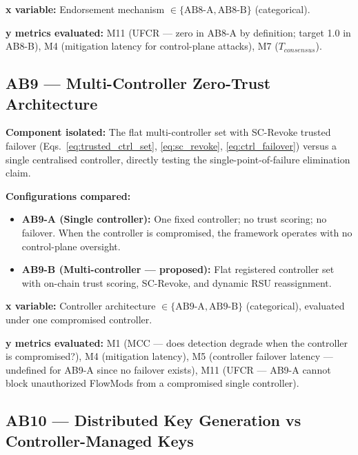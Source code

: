\documentclass[12pt, a4paper]{report}
\begin{document}
{{\textbf{x variable:} Endorsement mechanism
$\in \{\text{AB8-A}, \text{AB8-B}\}$ (categorical).

\textbf{y metrics evaluated:} M11 (UFCR — zero in
AB8-A by definition; target 1.0 in AB8-B), M4
(mitigation latency for control-plane attacks),
M7 ($T_{consensus}$).


\subsection{AB9 — Multi-Controller Zero-Trust
Architecture}
\label{sec:ab9}

\textbf{Component isolated:}
The flat multi-controller set with SC-Revoke trusted
failover (Eqs.~\ref{eq:trusted_ctrl_set},
\ref{eq:sc_revoke}, \ref{eq:ctrl_failover}) versus
a single centralised controller, directly testing the
single-point-of-failure elimination claim.

\textbf{Configurations compared:}
\begin{itemize}
    \item \textbf{AB9-A (Single controller):}
    One fixed controller; no trust scoring; no failover.
    When the controller is compromised, the framework
    operates with no control-plane oversight.
    \item \textbf{AB9-B (Multi-controller —
    proposed):} Flat registered controller set with
    on-chain trust scoring, SC-Revoke, and dynamic
    RSU reassignment.
\end{itemize}

\textbf{x variable:} Controller architecture
$\in \{\text{AB9-A}, \text{AB9-B}\}$ (categorical),
evaluated under one compromised controller.

\textbf{y metrics evaluated:} M1 (MCC — does detection
degrade when the controller is compromised?), M4
(mitigation latency), M5 (controller failover latency —
undefined for AB9-A since no failover exists), M11
(UFCR — AB9-A cannot block unauthorized FlowMods from
a compromised single controller).


\subsection{AB10 — Distributed Key Generation vs
Controller-Managed Keys}
\label{sec:ab10}

}}
\end{document}
